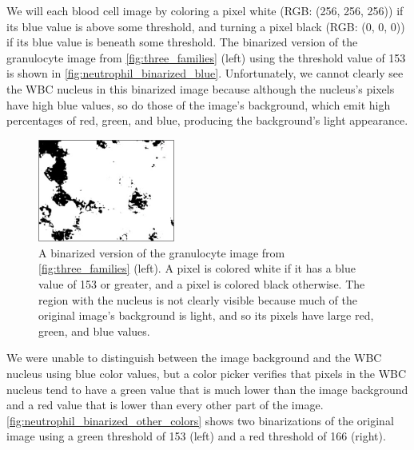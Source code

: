 We will  each blood cell image by coloring a pixel white (RGB: (256, 256, 256)) if its blue value is above some threshold, and turning a pixel black (RGB: (0, 0, 0)) if its blue value is beneath some threshold. The binarized version of the granulocyte image from \autoref{fig:three_families} (left) using the threshold value of 153 is shown in \autoref{fig:neutrophil_binarized_blue}. Unfortunately, we cannot clearly see the WBC nucleus in this binarized image because although the nucleus's pixels have high blue values, so do those of the image's background, which emit high percentages of red, green, and blue, producing the background's light appearance.\\

\begin{figure}[h]
\centering
\mySfFamily
\includegraphics[width = 0.4\textwidth]{../images/neutrophil_binarized_blue.png}
\caption{A binarized version of the granulocyte image from \autoref{fig:three_families} (left). A pixel is colored white if it has a blue value of 153 or greater, and a pixel is colored black otherwise. The region with the nucleus is not clearly visible because much of the original image's background is light, and so its pixels have large red, green, and blue values.}
\label{fig:neutrophil_binarized_blue}
\end{figure}

\begin{qbox}\end{qbox}

We were unable to distinguish between the image background and the WBC nucleus using blue color values, but a color picker verifies that pixels in the WBC nucleus tend to have a green value that is much lower than the image background and a red value that is lower than every other part of the image. \autoref{fig:neutrophil_binarized_other_colors} shows two binarizations of the original image using a green threshold of 153 (left) and a red threshold of 166 (right).

